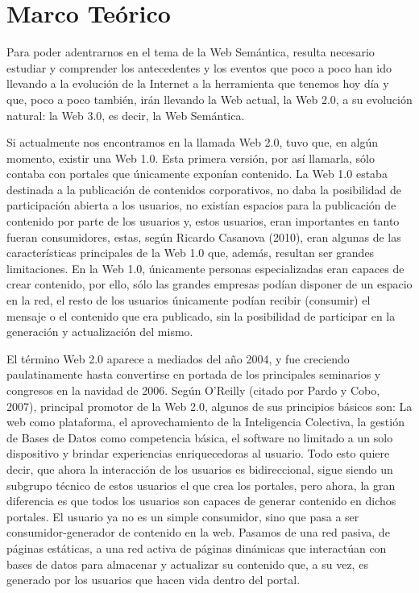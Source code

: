 \chapter{Marco Teórico}
\label{chap:marcoTeorico}

Para poder adentrarnos en el tema de la Web Semántica, resulta necesario estudiar y comprender los antecedentes y los eventos que poco a poco han ido llevando a la evolución de la Internet a la herramienta que tenemos hoy día y que, poco a poco también, irán llevando la Web actual, la Web 2.0, a su evolución natural: la Web 3.0, es decir, la Web Semántica.

Si actualmente nos encontramos en la llamada Web 2.0, tuvo que, en algún momento, existir una Web 1.0. Esta primera versión, por así llamarla, sólo contaba con portales que únicamente exponían contenido. La Web 1.0 estaba destinada a la publicación de contenidos corporativos, no daba la posibilidad de participación abierta a los usuarios, no existían espacios para la publicación de contenido por parte de los usuarios y, estos usuarios, eran importantes en tanto fueran consumidores, estas, según Ricardo Casanova (2010), eran algunas de las características principales de la Web 1.0 que, además, resultan ser grandes limitaciones. En la Web 1.0, únicamente personas especializadas eran capaces de crear contenido, por ello, sólo las grandes empresas podían disponer de un espacio en la red, el resto de los usuarios únicamente podían recibir (consumir) el mensaje o el contenido que era publicado, sin la posibilidad de participar en la generación y actualización del mismo.

El término Web 2.0 aparece a mediados del año 2004, y fue creciendo paulatinamente hasta convertirse en portada de los principales seminarios y congresos en la navidad de 2006. Según O'Reilly (citado por Pardo y Cobo, 2007), principal promotor de la Web 2.0, algunos de sus principios básicos son: La web como plataforma, el aprovechamiento de la Inteligencia Colectiva, la gestión de Bases de Datos como competencia básica, el software no limitado a un solo dispositivo y brindar experiencias enriquecedoras al usuario. Todo esto quiere decir, que ahora la interacción de los usuarios es bidireccional, sigue siendo un subgrupo técnico de estos usuarios el que crea los portales, pero ahora, la gran diferencia es que todos los usuarios son capaces de generar contenido en dichos portales. El usuario ya no es un simple consumidor, sino que pasa a ser consumidor-generador de contenido en la web. Pasamos de una red pasiva, de páginas estáticas, a una red activa de páginas dinámicas que interactúan con bases de datos para almacenar y actualizar su contenido que, a su vez, es generado por los usuarios que hacen vida dentro del portal. 

